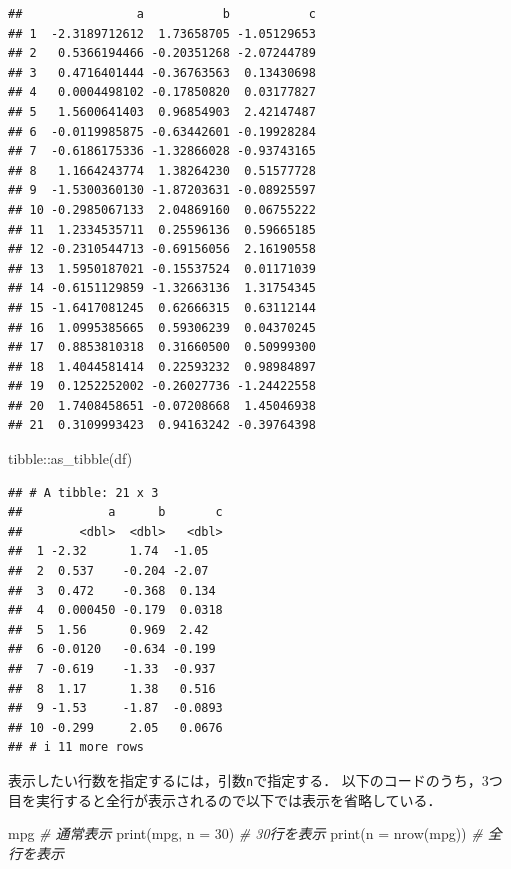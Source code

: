\documentclass[
]{article}
\newenvironment{Shaded}{\begin{snugshade}}{\end{snugshade}}
\newcommand{\AttributeTok}[1]{\textcolor[rgb]{0.77,0.63,0.00}{#1}}
\newcommand{\CommentTok}[1]{\textcolor[rgb]{0.56,0.35,0.01}{\textit{#1}}}
\newcommand{\DecValTok}[1]{\textcolor[rgb]{0.00,0.00,0.81}{#1}}
\newcommand{\FunctionTok}[1]{\textcolor[rgb]{0.00,0.00,0.00}{#1}}
\newcommand{\NormalTok}[1]{#1}
\newcommand{\SpecialCharTok}[1]{\textcolor[rgb]{0.00,0.00,0.00}{#1}}
\begin{document}
\begin{verbatim}
##                a           b           c
## 1  -2.3189712612  1.73658705 -1.05129653
## 2   0.5366194466 -0.20351268 -2.07244789
## 3   0.4716401444 -0.36763563  0.13430698
## 4   0.0004498102 -0.17850820  0.03177827
## 5   1.5600641403  0.96854903  2.42147487
## 6  -0.0119985875 -0.63442601 -0.19928284
## 7  -0.6186175336 -1.32866028 -0.93743165
## 8   1.1664243774  1.38264230  0.51577728
## 9  -1.5300360130 -1.87203631 -0.08925597
## 10 -0.2985067133  2.04869160  0.06755222
## 11  1.2334535711  0.25596136  0.59665185
## 12 -0.2310544713 -0.69156056  2.16190558
## 13  1.5950187021 -0.15537524  0.01171039
## 14 -0.6151129859 -1.32663136  1.31754345
## 15 -1.6417081245  0.62666315  0.63112144
## 16  1.0995385665  0.59306239  0.04370245
## 17  0.8853810318  0.31660500  0.50999300
## 18  1.4044581414  0.22593232  0.98984897
## 19  0.1252252002 -0.26027736 -1.24422558
## 20  1.7408458651 -0.07208668  1.45046938
## 21  0.3109993423  0.94163242 -0.39764398
\end{verbatim}

\begin{Shaded}
\begin{Highlighting}[]
\NormalTok{tibble}\SpecialCharTok{::}\FunctionTok{as\_tibble}\NormalTok{(df)}
\end{Highlighting}
\end{Shaded}

\begin{verbatim}
## # A tibble: 21 x 3
##            a      b       c
##        <dbl>  <dbl>   <dbl>
##  1 -2.32      1.74  -1.05  
##  2  0.537    -0.204 -2.07  
##  3  0.472    -0.368  0.134 
##  4  0.000450 -0.179  0.0318
##  5  1.56      0.969  2.42  
##  6 -0.0120   -0.634 -0.199 
##  7 -0.619    -1.33  -0.937 
##  8  1.17      1.38   0.516 
##  9 -1.53     -1.87  -0.0893
## 10 -0.299     2.05   0.0676
## # i 11 more rows
\end{verbatim}

表示したい行数を指定するには，引数\texttt{n}で指定する．
以下のコードのうち，3つ目を実行すると全行が表示されるので以下では表示を省略している．

\begin{Shaded}
\begin{Highlighting}[]
\NormalTok{mpg                  }\CommentTok{\# 通常表示}
\FunctionTok{print}\NormalTok{(mpg, }\AttributeTok{n =} \DecValTok{30}\NormalTok{)   }\CommentTok{\# 30行を表示}
\FunctionTok{print}\NormalTok{(}\AttributeTok{n =} \FunctionTok{nrow}\NormalTok{(mpg)) }\CommentTok{\# 全行を表示}
\end{Highlighting}
\end{Shaded}
\end{document}
